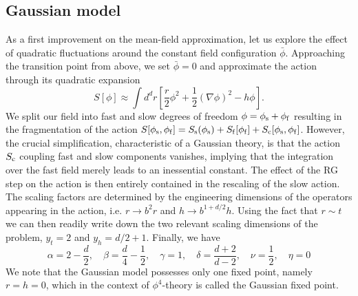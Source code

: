\subsection{Gaussian model}
As a first improvement on the mean-field approximation, let us explore the effect of quadratic fluctuations around the constant field configuration $\bar{\phi}$. Approaching the transition point from above, we set $\bar{\phi} = 0$ and approximate the action through its quadratic expansion
\[S[\phi] \approx \int d^dr \left[ \frac{r}{2}\phi^2 + \frac{1}{2}(\nabla\phi)^2- h\phi \right].\]
We split our field into fast and slow degrees of freedom $\phi = \phi_{\rm s} + \phi_{\rm f}$ resulting in the fragmentation of the action $S[\phi_{\rm s},\phi_{\rm f}] = S_{\rm s}(\phi_{\rm s}) + S_{\rm f}[\phi_{\rm f}] + S_{\rm c}[\phi_{\rm s},\phi_{\rm f}]$. 
However, the crucial simplification, characteristic of a Gaussian theory, is that the action $S_{\rm c}$ coupling fast and slow components vanishes, implying that the integration over the fast field merely leads to an inessential constant. 
The effect of the RG step on the action is then entirely contained in the rescaling of the slow action. The scaling factors are determined by the engineering dimensions of the operators appearing in the action, i.e. $r \to b^2r$ and $h \to b^{1+d/2}h$. Using the fact that $r \sim t$ we can then readily write down the two relevant scaling dimensions of the problem, $y_t = 2$ and $y_h = d/2 + 1$. Finally, we have
\[\alpha = 2 - \frac{d}{2} , \quad \beta = \frac{d}{4} - \frac{1}{2} , \quad \gamma = 1 , \quad \delta = \frac{d+2}{d-2} , \quad \nu = \frac{1}{2} , \quad \eta = 0\]
We note that the Gaussian model possesses only one fixed
point, namely $r = h = 0$, which in the context of $\phi^4$-theory is called the Gaussian fixed point.

